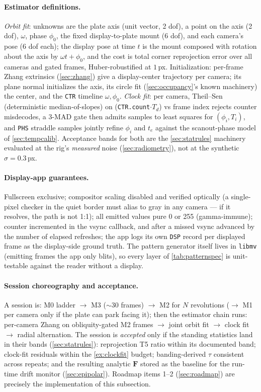 \documentclass[11pt]{article}
\theoremstyle{definition}
\newcommand{\mat}[1]{\mathbf{#1}}
\newcommand{\F}{\mat{F}}
\newcommand{\code}[1]{\texttt{#1}}
\begin{document}
\paragraph{Estimator definitions.} \emph{Orbit fit}: unknowns are the
plate axis (unit vector, 2 dof), a point on the axis (2 dof), $\omega$,
phase $\phi_0$, the fixed display-to-plate mount (6 dof), and each
camera's pose (6 dof each); the display pose at time $t$ is the mount
composed with rotation about the axis by $\omega t+\phi_0$, and the
cost is total corner reprojection error over all cameras and gated
frames, Huber-robustified at $1$\,px. Initialization: per-frame Zhang
extrinsics (\autoref{sec:zhang}) give a display-center trajectory per
camera; its plane normal initializes the axis, its circle fit
(\autoref{sec:occupancy}'s known machinery) the center, and the
\code{CTR} timeline $\omega,\phi_0$. \emph{Clock fit}: per camera,
Theil--Sen (deterministic median-of-slopes) on
(\code{CTR.count}$\cdot T_d$) vs frame index rejects counter
misdecodes, a 3-MAD gate then admits samples to least squares for
$(\phi_i, T_i)$, and \code{PHS} straddle samples jointly refine
$\phi_i$ and $t_e$ against the scanout-phase model of
\autoref{sec:tempcalib}. Acceptance bands for both are the
\autoref{sec:statrules} machinery evaluated at the rig's \emph{measured}
noise (\autoref{sec:radiometry}), not at the synthetic
$\sigma=0.3$\,px.

\paragraph{Display-app guarantees.} Fullscreen exclusive; compositor
scaling disabled and verified optically (a single-pixel checker in the
quiet border must alias to gray in any camera --- if it resolves, the
path is not 1:1); all emitted values pure 0 or 255 (gamma-immune);
counter incremented in the vsync callback, and after a missed vsync
advanced by the number of elapsed refreshes; the app logs its own
\code{DSP} record per displayed frame as the display-side ground truth.
The pattern generator itself lives in \code{libmv} (emitting frames the
app only blits), so every layer of \autoref{tab:patternspec} is
unit-testable against the reader without a display.

\paragraph{Session choreography and acceptance.} A session is:
M0 ladder $\to$ M3 ($\sim$30 frames) $\to$ M2 for $N$ revolutions
($\to$ M1 per camera only if the plate can park facing it); then the
estimator chain runs: per-camera Zhang on obliquity-gated M2 frames
$\to$ joint orbit fit $\to$ clock fit $\to$ radial alternation. The
session is \emph{accepted} only if the standing statistics land in
their bands (\autoref{sec:statrules}): reprojection T5 ratio within its
documented band; clock-fit residuals within the \autoref{ex:clockfit}
budget; banding-derived $\tau$ consistent across repeats; and the
resulting analytic $\F$ stored as the baseline for the run-time drift
monitor (\autoref{sec:epipolar}). Roadmap items 1--2
(\autoref{sec:roadmap}) are precisely the implementation of this
subsection.
\end{document}
